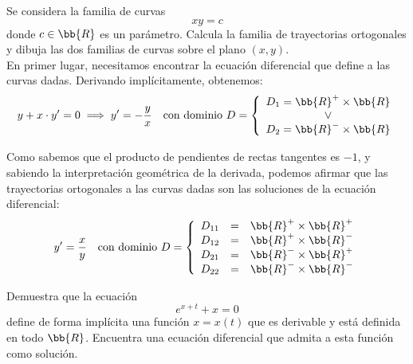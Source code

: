 \documentclass[12pt]{article}
\begin{document}
    \begin{ejercicio}
        Se considera la familia de curvas
        \begin{equation*}
            xy = c
        \end{equation*}
        donde $c \in \bb{R}$ es un parámetro. Calcula la familia de trayectorias ortogonales y dibuja las dos familias de curvas sobre el plano $(x, y)$.\\

        En primer lugar, necesitamos encontrar la ecuación diferencial que define a las curvas dadas. Derivando implícitamente, obtenemos:
        \begin{equation*}
            y + x\cdot y' = 0 \implies y' = -\frac{y}{x} \quad \text{con dominio } D=\left\{\begin{array}{c}
                D_1=\bb{R}^+\times\bb{R}\\ 
                \lor\\
                D_2=\bb{R}^-\times\bb{R}
            \end{array} \right.
        \end{equation*}

        Como sabemos que el producto de pendientes de rectas tangentes es $-1$, y sabiendo la interpretación geométrica de la derivada, podemos afirmar que las trayectorias ortogonales a las curvas dadas son las soluciones de la ecuación diferencial:
        \begin{equation*}
            y' = \frac{x}{y} \quad \text{con dominio } D=\left\{\begin{array}{rcl}
                D_{11} &=& \bb{R}^+\times\bb{R}^+\\
                D_{12} &=& \bb{R}^+\times\bb{R}^-\\
                D_{21} &=& \bb{R}^-\times\bb{R}^+\\
                D_{22} &=& \bb{R}^-\times\bb{R}^-
            \end{array} \right.
        \end{equation*}
    \end{ejercicio}

    \begin{ejercicio}
        Demuestra que la ecuación
        \begin{equation*}
            e^{x+t} + x = 0
        \end{equation*}
        define de forma implícita una función $x = x(t)$ que es derivable y está definida en todo $\bb{R}$. Encuentra una ecuación diferencial que admita a esta función como solución.
    \end{ejercicio}
\end{document}
